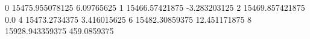 0 15475.955078125 6.09765625
1 15466.57421875 -3.283203125
2 15469.857421875 0.0
4 15473.2734375 3.416015625
6 15482.30859375 12.451171875
8 15928.943359375 459.0859375
